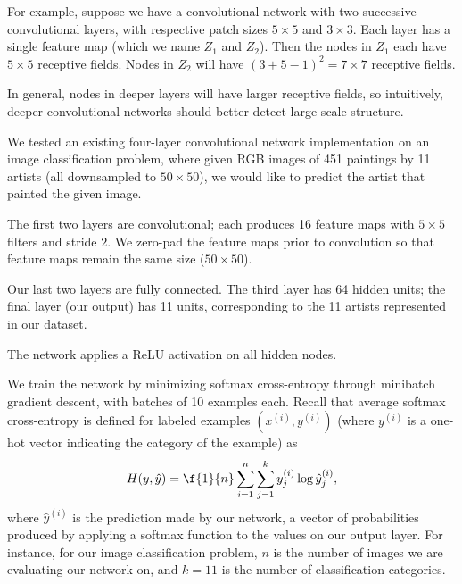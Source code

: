 \documentclass{article}
\newcommand{\sind}[1]{^{(#1)}}
\begin{document}
\begin{multicols}{2}
For example,
suppose we have a convolutional network
with two successive convolutional layers,
with respective patch sizes $5\times 5$ and $3\times 3$.
Each layer has a single feature map (which we name $Z_1$ and $Z_2$).
Then the nodes in $Z_1$ each have $5\times 5$ receptive fields.
Nodes in $Z_2$ will have $(3 + 5 - 1)^2 = 7\times 7$ receptive fields.

In general,
nodes in deeper layers will have larger receptive fields,
so intuitively,
deeper convolutional networks should better detect large-scale structure.

We tested an existing four-layer convolutional network implementation
on an image classification problem,
where given RGB images of 451 paintings by 11 artists
(all downsampled to $50\times 50$),
we would like to predict the artist that painted the given image.

The first two layers are convolutional;
each produces 16 feature maps
with $5\times 5$ filters and stride $2$.
We zero-pad the feature maps prior to convolution
so that feature maps remain the same size ($50\times 50$).

Our last two layers are fully connected.
The third layer has 64 hidden units;
the final layer (our output) has 11 units,
corresponding to the 11 artists represented in our dataset.

The network applies a ReLU activation on all hidden nodes.

We train the network by minimizing softmax cross-entropy
through minibatch gradient descent,
with batches of 10 examples each.
Recall that average softmax cross-entropy is defined
for labeled examples $(x\sind{i}, y\sind{i})$
(where $y\sind{i}$ is a one-hot vector indicating the category of the example)
as
\begin{equation}
    H(y, \hat y) = \f{1}{n}\sum_{i=1}^n
                             \sum_{j=1}^k
                               y\sind{i}_j \log \hat y\sind{i}_j,
\end{equation}
where $\hat y\sind{i}$ is the prediction made by our network,
a vector of probabilities
produced by applying a softmax function
to the values on our output layer.
For instance, for our image classification problem,
$n$ is the number of images we are evaluating our network on,
and $k=11$ is the number of classification categories.


\end{multicols}
\end{document}
